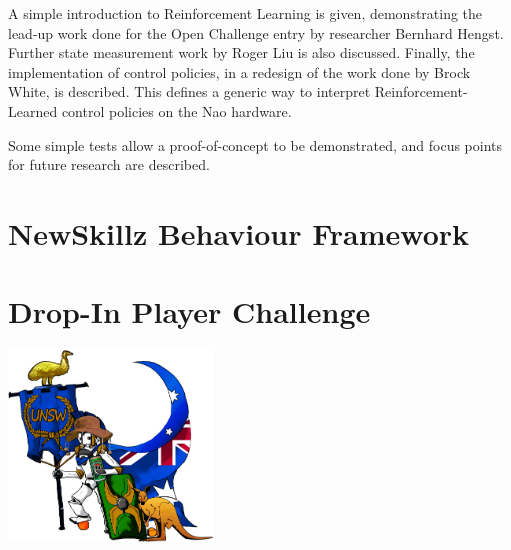 \documentclass[pdftex,11pt,a4paper]{report}
\begin{document}
A simple introduction to Reinforcement Learning is given, demonstrating the lead-up work done for the Open Challenge entry by researcher Bernhard Hengst.\cite{bernhard_rl} Further state measurement work by Roger Liu is also discussed.\cite{liu} Finally, the implementation of control policies, in a redesign of the work done by Brock White, is described.\cite{white} This defines a generic way to interpret Reinforcement-Learned control policies on the Nao hardware.

Some simple tests allow a proof-of-concept to be demonstrated, and focus points for future research are described.

\section{NewSkillz Behaviour Framework}

\section{Drop-In Player Challenge}





\newpage



\centering
\includegraphics[height=2in]{img/aus_stars.png}
\end{document}
